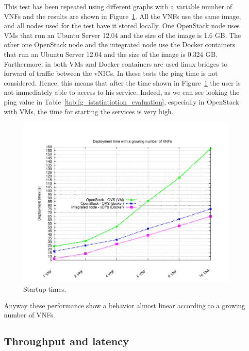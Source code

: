 This test has been repeated using different graphs with a variable number of VNFs and the results are shown in Figure~\ref{fig:startup_times}. All the VNFs use the same image, and all nodes used for the test have it stored locally. One OpenStack node uses VMs that run an Ubuntu Server 12.04 and the size of the image is 1.6 GB. The other one OpenStack node and the integrated node use the Docker containers that run an Ubuntu Server 12.04 and the size of the image is 0.324 GB. Furthermore, in both VMs and Docker containers are used linux bridges to forward of traffic between the vNICs. In these tests the ping time is not considered. Hence, this means that after the time shown in Figure~\ref{fig:startup_times} the user is not immediately able to access to his service. Indeed, as we can see looking the ping value in Table~\ref{tab:fg_istatiatiotion_evaluation}, especially in OpenStack with VMs, the time for starting the services is very high.
%
\begin{figure}[H]
	\centering
	\includegraphics[clip= true, width=0.5\columnwidth]{images/graphs/startup_times.pdf}
	\caption{Startup times.}
	\label{fig:startup_times}
\end{figure}
%
Anyway these performance show a behavior almost linear according to a growing number of VNFs.






\subsection{Throughput and latency}

